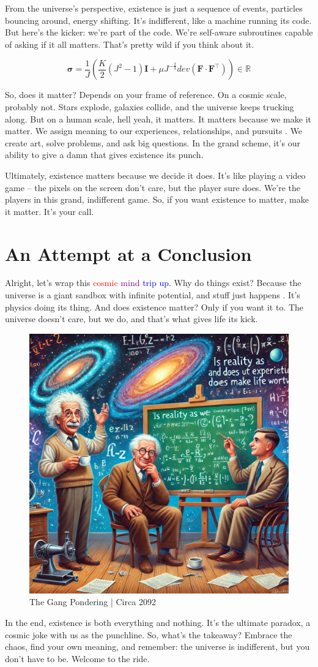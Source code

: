 \documentclass{Axon}
\begin{document}
From the universe's perspective, existence is just a sequence of events, particles bouncing around, energy shifting. It’s indifferent, like a machine running its code. But here’s the kicker: we’re part of the code. We’re self-aware subroutines capable of asking if it all matters. That’s pretty wild if you think about it.

\begin{equation}
    \boldsymbol{\sigma} = \frac{1}{J} \left(\frac{K}{2}(J^2-1)\boldsymbol{I}+\mu J^{-\frac{2}{3}} dev(\mathbf{F} \cdot \mathbf{F}^\intercal)\right) \in \mathbb{R}
\end{equation}

So, does it matter? Depends on your frame of reference. On a cosmic scale, probably not. Stars explode, galaxies collide, and the universe keeps trucking along. But on a human scale, hell yeah, it matters. It matters because we make it matter. We assign meaning to our experiences, relationships, and pursuits \cite{quantumTomfoolery2024}. We create art, solve problems, and ask big questions. In the grand scheme, it's our ability to give a damn that gives existence its punch.

Ultimately, existence matters because we decide it does. It’s like playing a video game – the pixels on the screen don’t care, but the player sure does. We’re the players in this grand, indifferent game. So, if you want existence to matter, make it matter. It's your call.
\section{An Attempt at a Conclusion}
Alright, let's wrap this \textcolor{red}{cosmic} \textcolor{purple}{mind} \textcolor{blue}{trip up}. Why do things exist? Because the universe is a giant sandbox with infinite potential, and stuff just happens \cite{quantumJokes}. It’s physics doing its thing. And does existence matter? Only if you want it to. The universe doesn’t care, but we do, and that’s what gives life its kick.

\begin{figure}[h]
    \centering
    \includegraphics[width=0.35\linewidth]{TheGang.jpeg}
    \caption{The Gang Pondering | Circa 2092}
    \label{fig:The Gang}
\end{figure}

In the end, existence is both everything and nothing. It’s the ultimate paradox, a cosmic joke with us as the punchline. So, what’s the takeaway? Embrace the chaos, find your own meaning, and remember: the universe is indifferent, but you don't have to be. Welcome to the ride.

\printbibliography
\end{document}

